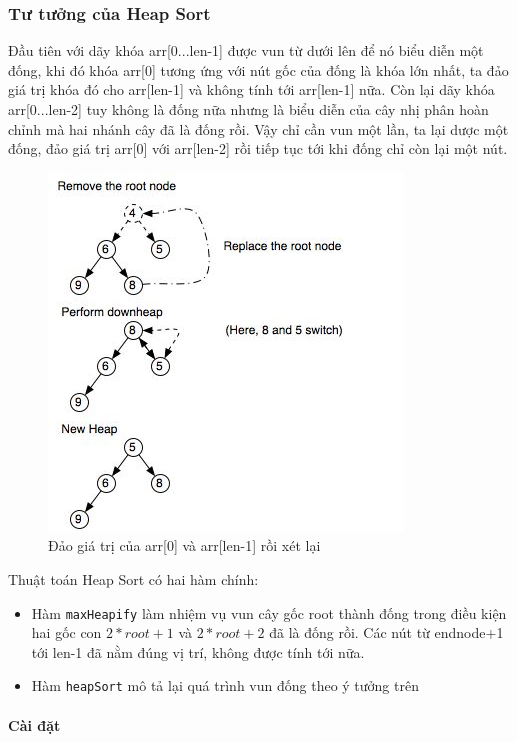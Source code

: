\documentclass[8pt, a4paper]{article}
\newcommand{\mnt}[1]{\inputminted[frame=single, linenos=true, tabsize=4]{c++}{#1}}
\begin{document}
\subsubsection{Tư tưởng của Heap Sort}

Đầu tiên với dãy khóa arr[0...len-1] được vun từ dưới lên để nó biểu diễn một đống, khi đó khóa arr[0] tương ứng với nút gốc của đống là khóa lớn nhất, ta đảo giá trị khóa đó cho arr[len-1] và không tính tới arr[len-1] nữa. Còn lại dãy khóa arr[0...len-2] tuy không là đống nữa nhưng là biểu diễn của cây nhị phân hoàn chỉnh mà hai nhánh cây đã là đống rồi. Vậy chỉ cần vun một lần, ta lại dược một đống, đảo giá trị arr[0] với arr[len-2] rồi tiếp tục tới khi đống chỉ còn lại một nút.
\begin{figure}[htp]
\centering
\includegraphics[scale=0.5]{img/tachdong.jpg}
\caption{Đảo giá trị của arr[0] và arr[len-1] rồi xét lại}
\label{}
\end{figure}

Thuật toán Heap Sort có hai hàm chính:

\begin{itemize}
\item Hàm \texttt{maxHeapify} làm nhiệm vụ vun cây gốc root thành đống trong điều kiện hai gốc con $2*root+1$ và $2*root+2$ đã là đống rồi. Các nút từ endnode+1 tới len-1 đã nằm đúng vị trí, không được tính tới nữa.
\item Hàm \texttt{heapSort} mô tả lại quá trình vun đống theo ý tưởng trên
\end{itemize}

\paragraph{Cài đặt}
\mnt{src/heapsort.cpp}
\end{document}
